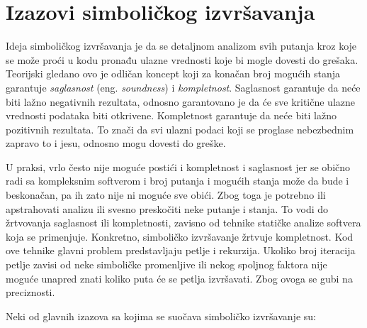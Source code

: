 \documentclass[12pt,oneside]{memoir}
\begin{document}
\section{Izazovi simboličkog izvršavanja}

Ideja simboličkog izvršavanja je da se detaljnom analizom svih putanja kroz koje se može proći u kodu pronađu ulazne vrednosti koje bi mogle dovesti do grešaka. Teorijski gledano ovo je odličan koncept koji za konačan broj mogućih stanja garantuje \textit{saglasnost} (eng. \textit{soundness}) i \textit{kompletnost}. Saglasnost garantuje da neće biti lažno negativnih rezultata, odnosno garantovano je da će sve kritične ulazne vrednosti podataka biti otkrivene. Kompletnost garantuje da neće biti lažno pozitivnih rezultata. To znači da svi ulazni podaci koji se proglase nebezbednim zapravo to i jesu, odnosno mogu dovesti do greške. 

U praksi, vrlo često nije moguće postići i kompletnost i saglasnost jer se obično radi sa kompleksnim softverom i broj putanja i mogućih stanja može da bude i beskonačan, pa ih zato nije ni moguće sve obići. Zbog toga je potrebno ili apstrahovati analizu ili svesno preskočiti neke putanje i stanja. To vodi do žrtvovanja saglasnost ili kompletnosti, zavisno od tehnike statičke analize softvera koja se primenjuje. Konkretno, simboličko izvršavanje žrtvuje kompletnost. Kod ove tehnike glavni problem predstavljaju petlje i rekurzija. Ukoliko broj iteracija petlje zavisi od neke simboličke promenljive ili nekog spoljnog faktora nije moguće unapred znati koliko puta će se petlja izvršavati. Zbog ovoga se gubi na preciznosti. 

Neki od glavnih izazova sa kojima se suočava simboličko izvršavanje su: 
\end{document}
